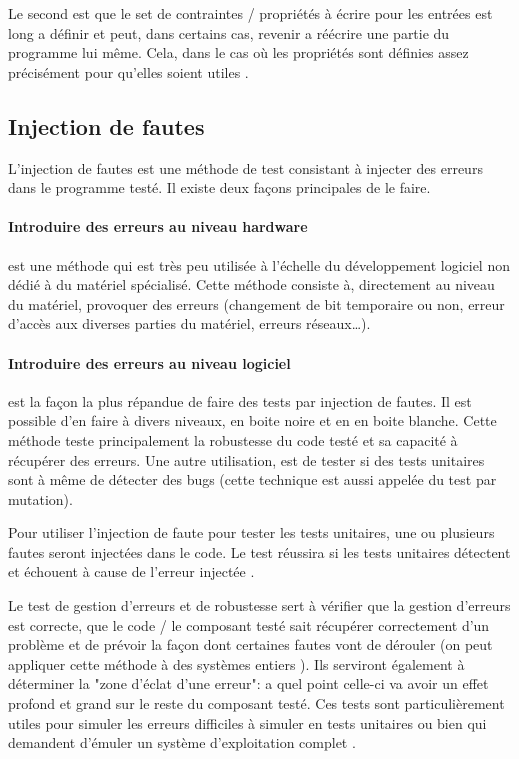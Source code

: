 \documentclass[a4paper]{report}
\begin{document}
Le second est que le set de contraintes / propriétés à écrire pour les entrées est long a définir et peut, dans certains cas, revenir  a réécrire une partie du programme lui même.
Cela, dans le cas où les propriétés sont définies assez précisément pour qu'elles soient utiles \cite{Papadakis2011}.

\subsection{Injection de fautes}

L'injection de fautes est une méthode de test consistant à injecter des erreurs dans le programme testé.
Il existe deux façons principales de le faire.


\paragraph{Introduire des erreurs au niveau hardware} est une méthode qui est très peu utilisée à l'échelle du développement logiciel non dédié à du matériel spécialisé.
Cette méthode consiste à, directement au niveau du matériel, provoquer des erreurs (changement de bit temporaire ou non, erreur d'accès aux diverses parties du matériel, erreurs réseaux…)\cite{Avresky1996}.

\paragraph{Introduire des erreurs au niveau logiciel} est la façon la plus répandue de faire des tests par injection de fautes.
Il est possible d'en faire à divers niveaux, en boite noire et en en boite blanche.
Cette méthode teste principalement la robustesse du code testé et sa capacité à récupérer des erreurs.
Une autre utilisation, est de tester si des tests unitaires sont à même de détecter des bugs (cette technique est aussi appelée du test par mutation).

Pour utiliser l'injection de faute pour tester les tests unitaires, une ou plusieurs fautes seront injectées dans le code.
Le test réussira si les tests unitaires détectent et échouent à cause de l'erreur injectée \cite{Segall}.

Le test de gestion d'erreurs et de robustesse sert à vérifier que la gestion d'erreurs est correcte, que le code / le composant testé sait récupérer correctement d'un problème et de prévoir la façon dont certaines fautes vont de dérouler \cite{Avresky1996} (on peut appliquer cette méthode à des systèmes entiers \cite{Lenka2018}).
Ils serviront également à déterminer la "zone d'éclat d'une erreur": a quel point celle-ci va avoir un effet profond et grand sur le reste du composant testé.
Ces tests sont particulièrement utiles pour simuler les erreurs difficiles à simuler en tests unitaires ou bien qui demandent d'émuler un système d'exploitation complet \cite{Marinescu2011}.
\end{document}
